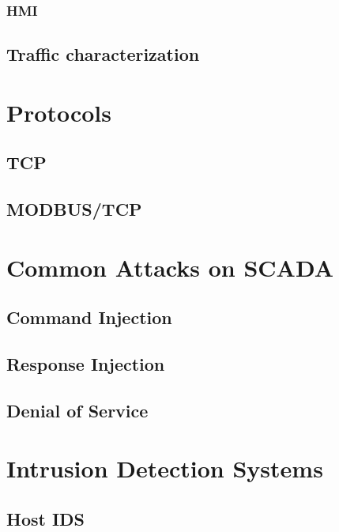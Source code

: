\documentclass[]{article}
\begin{document}
\subsubsection{HMI}\label{hmi}

\subsection{Traffic characterization}\label{traffic-characterization}

\section{Protocols}\label{protocols}

\subsection{TCP}\label{tcp}

\subsection{MODBUS/TCP}\label{modbustcp}

\section{Common Attacks on SCADA}\label{common-attacks-on-scada}

\subsection{Command Injection}\label{command-injection}

\subsection{Response Injection}\label{response-injection}

\subsection{Denial of Service}\label{denial-of-service}

\section{Intrusion Detection Systems}\label{intrusion-detection-systems}

\subsection{Host IDS}\label{host-ids}
\end{document}
